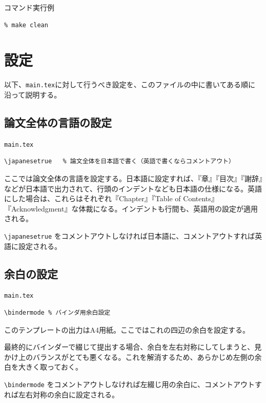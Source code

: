 \begin{itembox}[l]{コマンド実行例}
\begin{verbatim}
% make clean
\end{verbatim}
\end{itembox}

\section{設定}

以下、{\tt main.tex}に対して行うべき設定を、このファイルの中に書いてある順に沿って説明する。

\subsection{論文全体の言語の設定}
\label{sec:lang}

\begin{itembox}[l]{{\tt main.tex}}
\begin{verbatim}
\japanesetrue	% 論文全体を日本語で書く（英語で書くならコメントアウト）
\end{verbatim}
\end{itembox}

ここでは論文全体の言語を設定する。日本語に設定すれば、『章』『目次』『謝辞』などが日本語で出力されて、行頭のインデントなども日本語の仕様になる。英語にした場合は、これらはそれぞれ『Chapter』『Table of Contents』『Acknowledgment』な体裁になる。インデントも行間も、英語用の設定が適用される。

\verb|\japanesetrue| をコメントアウトしなければ日本語に、コメントアウトすれば英語に設定される。


\subsection{余白の設定}

\begin{itembox}[l]{{\tt main.tex}}
\begin{verbatim}
\bindermode	% バインダ用余白設定
\end{verbatim}
\end{itembox}

このテンプレートの出力はA4用紙。ここではこれの四辺の余白を設定する。

最終的にバインダーで綴じて提出する場合、余白を左右対称にしてしまうと、見かけ上のバランスがとても悪くなる。これを解消するため、あらかじめ左側の余白を大きく取っておく。

\verb|\bindermode| をコメントアウトしなければ左綴じ用の余白に、コメントアウトすれば左右対称の余白に設定される。

